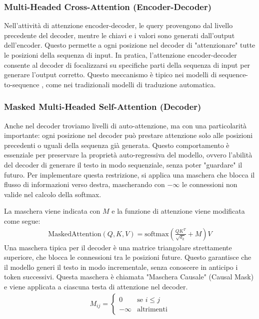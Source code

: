 \subsubsection{Multi-Headed Cross-Attention (Encoder-Decoder)}
Nell'attività di attenzione encoder-decoder, le query provengono dal livello precedente del decoder, mentre le chiavi e i valori sono generati dall'output dell'encoder. Questo permette a ogni posizione nel decoder di "attenzionare" tutte le posizioni della sequenza di input. In pratica, l'attenzione encoder-decoder consente al decoder di focalizzarsi su specifiche parti della sequenza di input per generare l'output corretto. Questo meccanismo è tipico nei modelli di sequence-to-sequence \cite{sutskever2014sequencesequencelearningneural}, come nei tradizionali modelli di traduzione automatica.

\subsubsection{Masked Multi-Headed Self-Attention (Decoder)}
\label{sec:masked-multi-head-attention}
Anche nel decoder troviamo livelli di auto-attenzione, ma con una particolarità importante: ogni posizione nel decoder può prestare attenzione solo alle posizioni precedenti o uguali della sequenza già generata. Questo comportamento è essenziale per preservare la proprietà auto-regressiva del modello, ovvero l'abilità del decoder di generare il testo in modo sequenziale, senza poter "guardare" il futuro. Per implementare questa restrizione, si applica una maschera che blocca il flusso di informazioni verso destra, mascherando con \(-\infty\)  le connessioni non valide nel calcolo della softmax.

La maschera viene indicata con \(M\) e la funzione di attenzione viene modificata come segue:
\begin{align*}
	\text{MaskedAttention}(Q, K, V) = \text{softmax}\left(\frac{QK^T}{\sqrt{d_k}} + M\right)V
\end{align*}
Una maschera tipica per il decoder è una matrice triangolare strettamente superiore, che blocca le connessioni tra le posizioni future. Questo garantisce che il modello generi il testo in modo incrementale, senza conoscere in anticipo i token successivi. Questa maschera è chiamata "Maschera Causale" (Causal Mask) e viene applicata a ciascuna testa di attenzione nel decoder.
\begin{align*}
	M_{ij} = \begin{cases}
		0 & \text{se } i \leq j \\
		-\infty & \text{altrimenti}
	\end{cases}
\end{align*}

